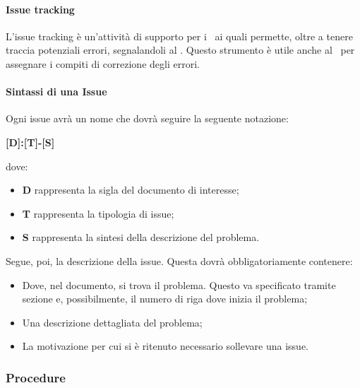 \documentclass[../NormeProgetto.tex]{subfiles}
\begin{document}
		\paragraph{Issue tracking}
		L'issue tracking è un'attività di supporto per i \verificatori\ ai quali permette, oltre a tenere traccia potenziali errori, segnalandoli al \responsabilediprogetto. Questo strumento è utile anche al \responsabilediprogetto\ per assegnare i compiti di correzione degli errori.
		\paragraph{Sintassi di una Issue}
		Ogni issue avrà un nome che dovrà seguire la seguente notazione: \begin{center}\textbf{[D]:[T]-[S]}\end{center} dove:
		\begin{itemize} 
			\item \textbf{D} rappresenta la sigla del documento di interesse;
			\item \textbf{T} rappresenta la tipologia di issue;
			\item \textbf{S} rappresenta la sintesi della descrizione del problema.
		\end{itemize}
		Segue, poi, la descrizione della issue. Questa dovrà obbligatoriamente contenere:
		\begin{itemize} 
			\item Dove, nel documento, si trova il problema. Questo va specificato tramite sezione e, possibilmente, il numero di riga dove inizia il problema;
			\item Una descrizione dettagliata del problema;
			\item La motivazione per cui si è ritenuto necessario sollevare una issue.
		\end{itemize}		
	\subsubsection{Procedure}	
\end{document}

